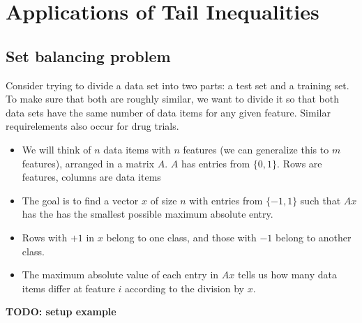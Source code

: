 \chapter{Applications of Tail Inequalities}


\section{Set balancing problem}

Consider trying to divide a data set into two parts: a test set and a training
set. To make sure that both are roughly similar, we want to divide it so that
both data sets have the same number of data items for any given feature.
Similar requirelements also occur for drug trials.

\begin{itemize}
\item We will think of $n$ data items with $n$ features (we can generalize this to
$m$ features), arranged in a matrix $A$. $A$ has entries from $\{0, 1\}$.
Rows are features, columns are data items

\item The goal is to find a vector $x$ of size $n$ with entries from $\{-1, 1\}$
such that $Ax$ has the has the smallest possible maximum absolute entry.

\item Rows with $+1$ in $x$ belong to one class, and those with $-1$ belong
to another class.

\item The maximum absolute value of each entry in $Ax$ tells us how many
data items differ at feature $i$ according to the division by $x$.
\end{itemize}

\textbf{TODO: setup example}
